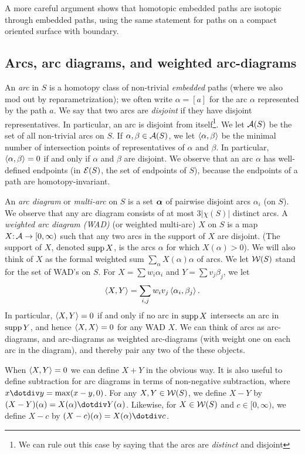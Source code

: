 A more careful argument shows that homotopic embedded paths are isotopic through embedded paths, using the same statement for paths on a compact oriented surface with boundary.

\subsection{Arcs, arc diagrams, and weighted arc-diagrams} \label{subsec:arcs}
An \emph{arc} in $S$ is a homotopy class of non-trivial \emph{embedded} paths (where we also mod out by reparametrization); 
we often write $\alpha = [a]$ for the arc $\alpha$ represented by the path $a$.
We say that two arcs are \emph{disjoint} if they have disjoint representatives.
In particular, an arc is disjoint from itself\footnote{We can rule out this case by saying that the arcs are \emph{distinct} and disjoint}. 
We let ${\mathcal A}(S)$ be the set of all non-trivial arcs on $S$.
If $\alpha, \beta \in {\mathcal A}(S)$, 
we let $\left< \alpha, \beta \right>$ be the minimal number of intersection points
 of representatives of $\alpha$ and $\beta$. 
In particular, 
$\left< \alpha, \beta \right> = 0$ if and only if $\alpha$ and $\beta$ are disjoint.  
We observe that an arc $\alpha$ has well-defined endpoints 
(in ${\mathcal E}(S)$,
the set of endpoints of $S$), 
because the endpoints of a path are homotopy-invariant. 


An {\it arc diagram} or \emph{multi-arc} on $S$ is a set  $\boldsymbol{\alpha}$ of pairwise disjoint arcs $\alpha_i$ (on $S$).
We observe that any arc diagram consists of at most $3|\chi(S)|$ distinct arcs.
A {\it weighted arc diagram (WAD) } (or weighted multi-arc) $X$ on $S$
is a map $X \mathpunct: {\mathcal A} \to [0, \infty)$ such that any two arcs in the support of $X$ are disjoint.
(The support of $X$, denoted $\operatorname{supp} X$, is the arcs $\alpha$ for which $X(\alpha) > 0$). 
We will also think of $X$ as the formal weighted sum $\sum_\alpha X(\alpha) \alpha$ of arcs. 
We let ${\mathcal W}(S)$ stand for the set of WAD's on $S$.
For $X=\sum w_i \alpha_i$ and $Y = \sum v_j\beta_j$,
we let 
$$\left< X, Y \right> = \sum_{i, j} w_i v_j \left< \alpha_i, \beta_j \right>.$$
In particular, 
$\left< X, Y \right> = 0$ if and only if no arc in $\operatorname{supp} X$ intersects an arc in $\operatorname{supp} Y$, 
and hence $\left< X, X \right> = 0$ for any WAD $X$.
We can think of arcs as arc-diagrams, and arc-diagrams as weighted arc-diagrams 
(with weight one on each arc in the diagram),
and thereby pair any two of the these objects. 

When $\left< X, Y \right> = 0$ we can define $X+Y$ in the obvious way.
It is also useful to define subtraction for arc diagrams in terms of non-negative subtraction,
where
$
x \nnm y = \max(x - y, 0)$.
For any $X, Y \in {\mathcal W}(S)$, we define $X-Y$ by $(X-Y)(\alpha)= X(\alpha) \nnm Y(\alpha)$.
Likewise, for $X \in {\mathcal W}(S)$ and $c \in [0, \infty)$, 
we define $X-c$ by $(X - c)(\alpha) = X(\alpha) \nnm c$.

